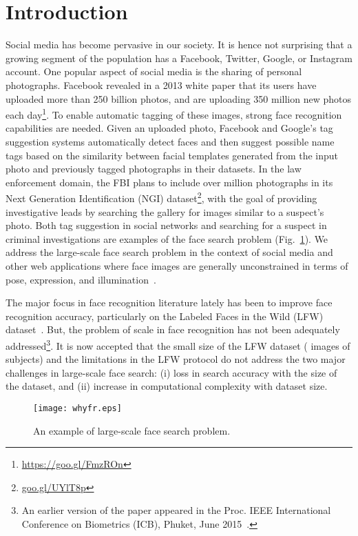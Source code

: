 \documentclass[10pt,journal,compsoc]{IEEEtran}
\begin{document}
\maketitle
\IEEEdisplaynontitleabstractindextext
\IEEEpeerreviewmaketitle

\section{Introduction}\label{sec:introduction}
Social media has become pervasive in our society. It is hence not surprising that a growing segment of the population has a Facebook, Twitter, Google, or Instagram account. One popular aspect of social media is the sharing of personal photographs. Facebook revealed in a 2013 white paper that its users have uploaded more than 250 billion photos, and are uploading 350 million new photos each day\footnote{\url{https://goo.gl/FmzROn}}. To enable automatic tagging of these images, strong face recognition capabilities are needed. Given an uploaded photo, Facebook and Google's tag suggestion systems automatically detect faces and then suggest possible name tags based on the similarity between facial templates generated from the input photo and previously tagged photographs in their datasets. In the law enforcement domain, the FBI plans to include over  million photographs in its Next Generation Identification (NGI) dataset\footnote{\url{goo.gl/UYlT8p}}, with the goal of providing investigative leads by searching the gallery for images similar to a suspect's photo. Both tag suggestion in social networks and searching for a suspect in criminal investigations are examples of the face search problem (Fig.~\ref{fig:intro}). We address the large-scale face search problem in the context of social media and other web applications where face images are generally unconstrained in terms of pose, expression, and illumination~\cite{faceretrieval:chen2012, faceretrieval:wu2010}.

The major focus in face recognition literature lately has been to improve face recognition accuracy, particularly on the Labeled Faces in the Wild (LFW) dataset~\cite{DB:LFWTech}. But, the problem of scale in face recognition has not been adequately addressed\footnote{An earlier version of the paper appeared in the Proc. IEEE International Conference on Biometrics (ICB), Phuket, June 2015~\cite{icb2015}.}. It is now accepted that the small size of the LFW dataset ( images of  subjects) and the limitations in the LFW protocol do not address the two major challenges in large-scale face search:
(i) loss in search accuracy with the size of the dataset, and (ii) increase in computational complexity  with dataset size.
\begin{figure}
  \centering
  \texttt{[image: whyfr.eps]}\\
  \caption{An example of large-scale face search problem.}\label{fig:intro}
\end{figure}
\end{document}
